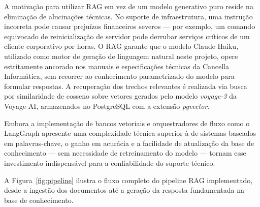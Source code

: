 \documentclass[a4paper,12pt,Times]{article}
\begin{document}
A motivação para utilizar RAG em vez de um modelo generativo puro reside na eliminação
de alucinações técnicas. No suporte de infraestrutura, uma instrução incorreta pode causar
prejuízos financeiros severos — por exemplo, um comando equivocado de reinicialização de
servidor pode derrubar serviços críticos de um cliente corporativo por horas. O RAG garante
que o modelo Claude Haiku, utilizado como motor de geração de linguagem natural neste
projeto, opere estritamente ancorado nos manuais e especificações técnicas da Cancella
Informática, sem recorrer ao conhecimento parametrizado do modelo para formular respostas.
A recuperação dos trechos relevantes é realizada via busca por similaridade de cosseno sobre
vetores gerados pelo modelo \textit{voyage-3} da Voyage AI, armazenados no PostgreSQL com
a extensão \textit{pgvector}.

Embora a implementação de bancos vetoriais e orquestradores de fluxo como o LangGraph
apresente uma complexidade técnica superior à de sistemas baseados em palavras-chave, o
ganho em acurácia e a facilidade de atualização da base de conhecimento — sem necessidade
de retreinamento do modelo — tornam esse investimento indispensável para a confiabilidade
do suporte técnico.

A Figura~\ref{fig:pipeline} ilustra o fluxo completo do pipeline RAG implementado,
desde a ingestão dos documentos até a geração da resposta fundamentada na base de
conhecimento.
\end{document}
